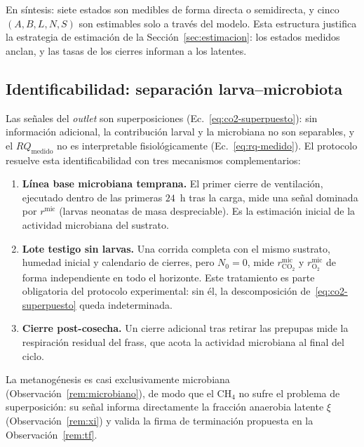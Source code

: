 En síntesis: siete estados son medibles de forma directa o semidirecta,
y cinco $(A, B, L, N, S)$ son estimables solo a través del modelo. Esta
estructura justifica la estrategia de estimación de la
Sección~\ref{sec:estimacion}: los estados medidos anclan, y las tasas de
los cierres informan a los latentes.

\subsection{Identificabilidad: separación larva--microbiota}\label{sec:identificabilidad}

Las señales del \emph{outlet} son superposiciones
(Ec.~\eqref{eq:co2-superpuesto}): sin información adicional, la
contribución larval y la microbiana no son separables, y el
$RQ_{\mathrm{medido}}$ no es interpretable fisiológicamente
(Ec.~\eqref{eq:rq-medido}). El protocolo resuelve esta identificabilidad
con tres mecanismos complementarios:

\begin{enumerate}
  \item \textbf{Línea base microbiana temprana.} El primer cierre de
  ventilación, ejecutado dentro de las primeras $24$~h tras la carga,
  mide una señal dominada por $r^{\mathrm{mic}}$ (larvas neonatas de
  masa despreciable). Es la estimación inicial de la actividad
  microbiana del sustrato.
  \item \textbf{Lote testigo sin larvas.} Una corrida completa con el
  mismo sustrato, humedad inicial y calendario de cierres, pero
  $N_0 = 0$, mide $r^{\mathrm{mic}}_{\mathrm{CO_2}}$ y
  $r^{\mathrm{mic}}_{\mathrm{O_2}}$ de forma independiente en todo el
  horizonte. Este tratamiento es parte obligatoria del protocolo
  experimental: sin él, la descomposición
  de~\eqref{eq:co2-superpuesto} queda indeterminada.
  \item \textbf{Cierre post-cosecha.} Un cierre adicional tras retirar
  las prepupas mide la respiración residual del frass, que acota la
  actividad microbiana al final del ciclo.
\end{enumerate}

\begin{remark}
La metanogénesis es casi exclusivamente microbiana
(Observación~\ref{rem:microbiano}), de modo que el CH$_4$ no sufre el
problema de superposición: su señal informa directamente la fracción
anaerobia latente $\xi$ (Observación~\ref{rem:xi}) y valida la firma de
terminación propuesta en la Observación~\ref{rem:tf}.
\end{remark}

